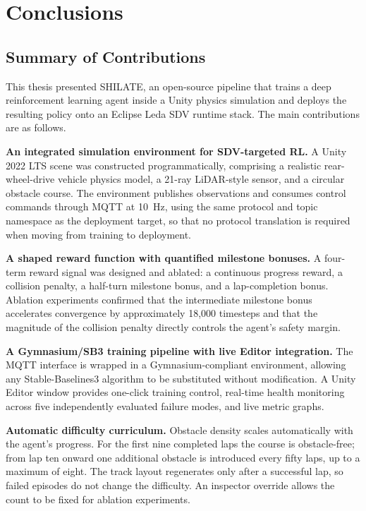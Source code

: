 \chapter{Conclusions}\label{ch:conclusions}
\thispagestyle{pagestyle}

\section{Summary of Contributions}
\label{sec:contributions}

This thesis presented SHILATE, an open-source pipeline that trains a
deep reinforcement learning agent inside a Unity physics simulation and
deploys the resulting policy onto an Eclipse Leda SDV runtime stack.
The main contributions are as follows.

\textbf{An integrated simulation environment for SDV-targeted RL.} A
Unity 2022 LTS scene was constructed programmatically, comprising a
realistic rear-wheel-drive vehicle physics model, a 21-ray LiDAR-style
sensor, and a circular obstacle course. The environment publishes
observations and consumes control commands through MQTT at 10~Hz, using
the same protocol and topic namespace as the deployment target, so that
no protocol translation is required when moving from training to
deployment.

\textbf{A shaped reward function with quantified milestone bonuses.} A
four-term reward signal was designed and ablated: a continuous progress
reward, a collision penalty, a half-turn milestone bonus, and a
lap-completion bonus. Ablation experiments confirmed that the
intermediate milestone bonus accelerates convergence by approximately
18{,}000 timesteps and that the magnitude of the collision penalty
directly controls the agent's safety margin.

\textbf{A Gymnasium/SB3 training pipeline with live Editor integration.}
The MQTT interface is wrapped in a Gymnasium-compliant environment,
allowing any Stable-Baselines3 algorithm to be substituted without
modification. A Unity Editor window provides one-click training control,
real-time health monitoring across five independently evaluated failure
modes, and live metric graphs.

\textbf{Automatic difficulty curriculum.} Obstacle density scales
automatically with the agent's progress. For the first nine completed
laps the course is obstacle-free; from lap ten onward one additional
obstacle is introduced every fifty laps, up to a maximum of eight. The
track layout regenerates only after a successful lap, so failed episodes
do not change the difficulty. An inspector override allows the count to
be fixed for ablation experiments.

